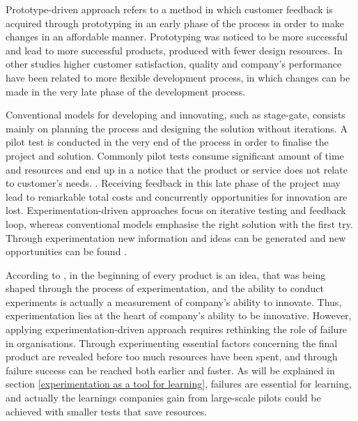 Prototype-driven approach refers to a method in which customer feedback is acquired through prototyping in an early phase of the process in order to make changes in an affordable manner. Prototyping was noticed to be more successful and lead to more successful products, produced with fewer design resources. In other studies higher customer satisfaction, quality and company's performance have been related to more flexible development process, in which changes can be made in the very late phase of the development process. \citep{thomke1998agile}

Conventional models for developing and innovating, such as stage-gate, consists mainly on planning the process and designing the solution without iterations. A pilot test is conducted in the very end of the process in order to finalise the project and solution. Commonly pilot tests consume significant amount of time and resources and end up in a notice that the product or service does not relate to customer's needs. \citep{schrage1993culture}. Receiving feedback in this late phase of the project may lead to remarkable total costs and concurrently opportunities for innovation are lost. Experimentation-driven approaches focus on iterative testing and feedback loop, whereas conventional models emphasise the right solution with the first try. \citep{thomke2003r} Through experimentation new information and ideas can be generated and new opportunities can be found \citep{tuulenmaki2011art, mcgrath2010business}. 

According to \citet{thomke2001enlightened}, in the beginning of every product is an idea, that was being shaped through the process of experimentation, and the ability to conduct experiments is actually a measurement of company's ability to innovate. Thus, experimentation lies at the heart of company's ability to be innovative. However, applying experimentation-driven approach requires rethinking the role of failure in organisations. Through experimenting essential factors concerning the final product are revealed before too much resources have been spent, and through failure success can be reached both earlier and faster. \citep{thomke2003r} As will be explained in section \ref{experimentation as a tool for learning}, failures are essential for learning, and actually the learnings companies gain from large-scale pilots could be achieved with smaller tests that save resources. \citep{anderson2011step}


